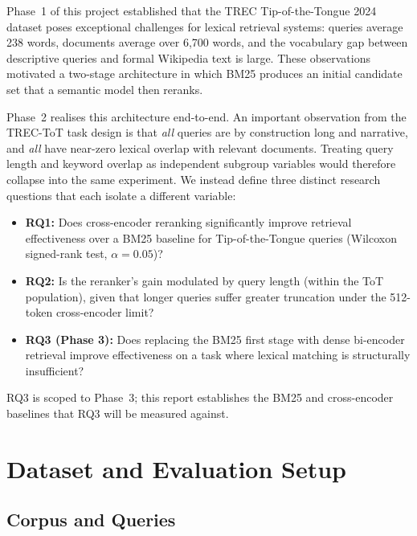 \documentclass[conference]{IEEEtran}
\begin{document}
Phase~1 of this project established that the TREC Tip-of-the-Tongue 2024
dataset poses exceptional challenges for lexical retrieval systems: queries
average 238 words, documents average over 6{,}700 words, and the vocabulary
gap between descriptive queries and formal Wikipedia text is large.
These observations motivated a two-stage architecture in which BM25 produces
an initial candidate set that a semantic model then reranks.

Phase~2 realises this architecture end-to-end.
An important observation from the TREC-ToT task design is that
\emph{all} queries are by construction long and narrative, and
\emph{all} have near-zero lexical overlap with relevant documents.
Treating query length and keyword overlap as independent subgroup variables
would therefore collapse into the same experiment.
We instead define three distinct research questions that each isolate a
different variable:

\begin{itemize}
  \item \textbf{RQ1:} Does cross-encoder reranking significantly improve
        retrieval effectiveness over a BM25 baseline for Tip-of-the-Tongue
        queries (Wilcoxon signed-rank test, $\alpha=0.05$)?
  \item \textbf{RQ2:} Is the reranker's gain modulated by query length
        (within the ToT population), given that longer queries suffer greater
        truncation under the 512-token cross-encoder limit?
  \item \textbf{RQ3 (Phase 3):} Does replacing the BM25 first stage with
        dense bi-encoder retrieval improve effectiveness on a task where
        lexical matching is structurally insufficient?
\end{itemize}

RQ3 is scoped to Phase~3; this report establishes the BM25 and cross-encoder
baselines that RQ3 will be measured against.

\section{Dataset and Evaluation Setup}
\label{sec:dataset}

\subsection{Corpus and Queries}
\end{document}
